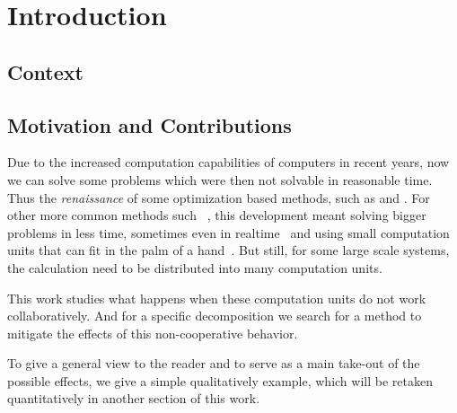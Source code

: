 \documentclass[../main.tex]{subfiles}
\begin{document}
\chapter{Introduction}\label{cha:introduction}
\minitoc

\section{Context}

\section{Motivation and Contributions}
Due to the increased computation capabilities of computers in recent years,
now we can solve some problems which were then not solvable in reasonable time.
Thus the \emph{renaissance} of some optimization based methods, such as  and .
For other more common methods such \mpc~\cite{GarciaEtAl1989}, this development meant solving bigger problems in less time, sometimes even in realtime~ and using small computation units that can fit in the palm of a hand~\cite{BanguraMahony2014}.
But still, for some large scale systems, the calculation need to be distributed into many computation units.

This work studies what happens when these computation units do not work collaboratively.
And for a specific decomposition we search for a method to mitigate the effects of this non-cooperative behavior.

To give a general view to the reader and to serve as a main take-out of the possible effects, we give a simple qualitatively example, which will be retaken quantitatively in another section of this work.
\end{document}
